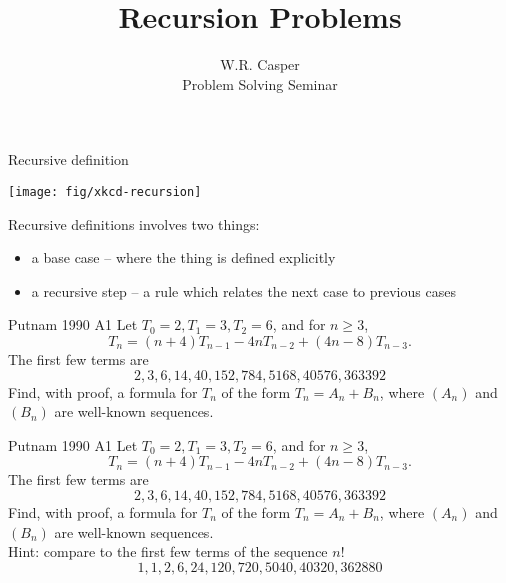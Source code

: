 \documentclass{beamer}
\title{Recursion Problems}
\author[W.R. Casper] %
{W.R. Casper\\\vspace{0.2in}
 {\tiny Problem Solving Seminar}}
\institute[California State University Fullerton] %
{
  Department of Mathematics\\
  California State University Fullerton}
\begin{document}
\begin{frame}
  \titlepage
\end{frame}




\begin{frame}{Recursive definition}
\begin{center}
\texttt{[image: fig/xkcd-recursion]}
\end{center}
Recursive definitions involves two things:
\begin{itemize}
\item a base case -- where the thing is defined explicitly
\item a recursive step -- a rule which relates the next case to previous cases
\end{itemize}
\end{frame}

\begin{frame}{Putnam 1990 A1}
Let $T_0 = 2, T_1 = 3, T_2 = 6$, and for $n \geq 3$,
$$T_n = (n + 4)T_{n-1} - 4nT_{n-2} + (4n - 8)T_{n-3}.$$
The first few terms are
$$2, 3, 6, 14, 40, 152, 784, 5168, 40576, 363392$$
Find, with proof, a formula for $T_n$ of the form $T_n = A_n+B_n$, where $(A_n)$ and $(B_n)$ are well-known sequences.
\end{frame}
\begin{frame}{Putnam 1990 A1}
Let $T_0 = 2, T_1 = 3, T_2 = 6$, and for $n \geq 3$,
$$T_n = (n + 4)T_{n-1} - 4nT_{n-2} + (4n - 8)T_{n-3}.$$
The first few terms are
$$2, 3, 6, 14, 40, 152, 784, 5168, 40576, 363392$$
Find, with proof, a formula for $T_n$ of the form $T_n = A_n+B_n$, where $(A_n)$ and $(B_n)$ are well-known sequences.\\
{\color{red}Hint: compare to the first few terms of the sequence $n!$
$$1, 1, 2, 6, 24, 120, 720, 5040, 40320, 362880$$}
\end{frame}
\end{document}
